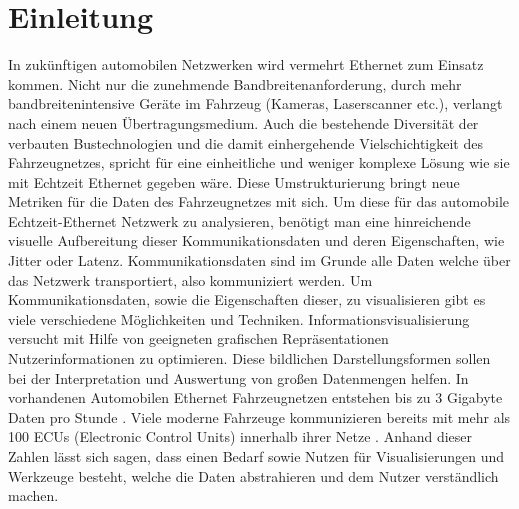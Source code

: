 \documentclass[draft=false
              ,paper=a4
              ,twoside=false
              ,fontsize=11pt
              ,headsepline
              ,BCOR10mm
              ,DIV11
              ]{scrbook}
\begin{document}
\mainmatter
\onehalfspacing

\chapter{Einleitung} %
\label{cha:einleitung}
In zukünftigen automobilen Netzwerken wird vermehrt Ethernet zum Einsatz kommen. Nicht nur die zunehmende Bandbreitenanforderung, durch mehr bandbreitenintensive Geräte im Fahrzeug (Kameras, Laserscanner etc.), verlangt nach einem neuen Übertragungsmedium. Auch die bestehende Diversität der verbauten Bustechnologien und die damit einhergehende Vielschichtigkeit des Fahrzeugnetzes, spricht für eine einheitliche und weniger komplexe Lösung wie sie mit Echtzeit Ethernet gegeben wäre. Diese Umstrukturierung bringt neue Metriken für die Daten des Fahrzeugnetzes mit sich. Um diese für das automobile Echtzeit-Ethernet Netzwerk zu analysieren, benötigt man eine hinreichende visuelle Aufbereitung dieser Kommunikationsdaten und deren Eigenschaften, wie Jitter oder Latenz. Kommunikationsdaten sind im Grunde alle Daten welche über das Netzwerk transportiert, also kommuniziert werden. Um Kommunikationsdaten, sowie die Eigenschaften dieser, zu visualisieren gibt es viele verschiedene Möglichkeiten und Techniken. Informationsvisualisierung versucht mit Hilfe von geeigneten grafischen Repräsentationen Nutzerinformationen zu optimieren. Diese bildlichen Darstellungsformen sollen bei der Interpretation und Auswertung von großen Datenmengen helfen. In vorhandenen Automobilen Ethernet Fahrzeugnetzen entstehen bis zu 3 Gigabyte Daten pro Stunde \cite{core_2017}. Viele moderne Fahrzeuge kommunizieren bereits mit mehr als 100 ECUs (Electronic Control Units) innerhalb ihrer Netze \cite{broy_cross-layer_2011}. Anhand dieser Zahlen lässt sich sagen, dass einen Bedarf sowie Nutzen für Visualisierungen und Werkzeuge besteht, welche die Daten abstrahieren und dem Nutzer verständlich machen.
\end{document}
